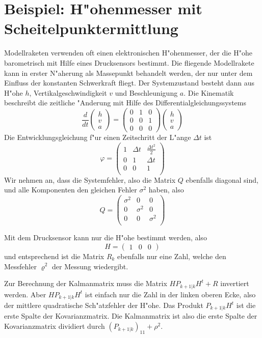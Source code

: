 \section{Beispiel: H"ohenmesser mit Scheitelpunktermittlung}
Modellraketen verwenden oft einen elektronischen H"ohenmesser, der die H"ohe
barometrisch mit Hilfe eines Drucksensors bestimmt.
Die fliegende Modellrakete
kann in erster N"aherung als Massepunkt behandelt werden, der nur unter dem
Einfluss der konstanten Schwerkraft fliegt.
Der Systemzustand besteht
dann aus H"ohe $h$, Vertikalgeschwindigkeit $v$ und Beschleunigung $a$.
Die Kinematik beschreibt die zeitliche "Anderung mit Hilfe des
Differentialgleichungssystems
\[
\frac{d}{dt}
\begin{pmatrix}
h\\v\\a
\end{pmatrix}
=
\begin{pmatrix}
0&1&0\\
0&0&1\\
0&0&0
\end{pmatrix}
\begin{pmatrix}
h\\v\\a
\end{pmatrix}
\]
Die Entwicklungsgleichung f"ur einen Zeitschritt der L"ange $\Delta t$ ist
\[
\varphi=\begin{pmatrix}
1&\Delta t&\frac{\Delta t^2}2\\
0&1&\Delta t\\
0&0&1\\
\end{pmatrix}
\]
Wir nehmen an, dass die Systemfehler, also die Matrix $Q$ ebenfalls diagonal sind,
und alle Komponenten den gleichen Fehler $\sigma^2$ haben, also
\[
Q=\begin{pmatrix}
\sigma^2&0&0\\
0&\sigma^2&0\\
0&0&\sigma^2\\
\end{pmatrix}
\]

Mit dem Drucksensor kann nur die H"ohe bestimmt werden, also
\[
H=\begin{pmatrix}1&0&0\end{pmatrix}
\]
und entsprechend ist die Matrix $R_k$ ebenfalls nur eine Zahl, welche
den Messfehler $\varrho^2$ der Messung wiedergibt.

Zur Berechnung der Kalmanmatrix muss die Matrix $HP_{k+1|k}H^t+R$ invertiert werden.
Aber $HP_{k+1|k}H^t$ ist einfach nur die Zahl in der linken oberen Ecke, also
der mittlere quadratische Sch"atzfehler der H"ohe.
Das Produkt $P_{k+1|k}H^t$
ist die erste Spalte der Kovarianzmatrix.
Die Kalmanmatrix ist also die erste
Spalte der Kovarianzmatrix dividiert durch $(P_{k+1|k})_{11}+\rho^2$.

